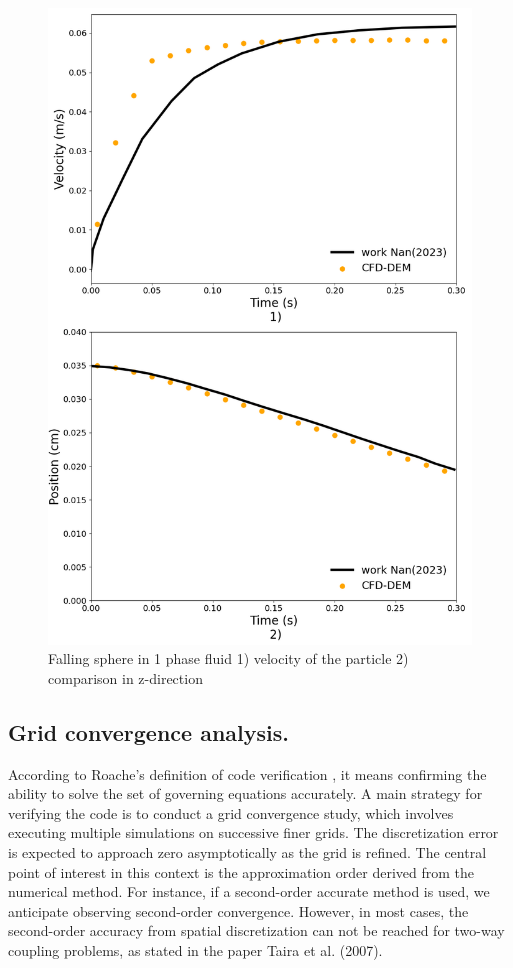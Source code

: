 \begin{figure}[!h]
    \centering
    \includegraphics[width=13cm]{GWU_Thesis_Sarmakeeva/Images/chap3/nan_simulation_192000_cells_dt_0_0005_simulation.png}
    \caption{Falling sphere in 1 phase fluid 1) velocity of the particle 2) comparison in z-direction}
    \label{fig:trajectory_1ph}
\end{figure}

\newpage

\subsection{Grid convergence analysis.}

According to Roache's definition of code verification \cite{roache1998verification}, it means confirming the ability to solve the set of governing equations accurately. A main strategy for verifying the code is to conduct a grid convergence study, which involves executing multiple simulations on successive finer grids. The discretization error is expected to approach zero asymptotically as the grid is refined. The central point of interest in this context is the approximation order derived from the numerical method. For instance, if a second-order accurate method is used, we anticipate observing second-order convergence. However, in most cases, the second-order accuracy from spatial discretization can not be reached for two-way coupling problems, as stated in the paper Taira et al. (2007)\cite{taira2007immersed}.

